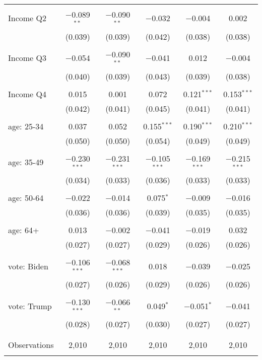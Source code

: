 \begin{tabular}{@{\extracolsep{5pt}}lccccc}
  & & & & & \\ 
 Income Q2 & $-$0.089$^{**}$ & $-$0.090$^{**}$ & $-$0.032 & $-$0.004 & 0.002 \\ 
  & (0.039) & (0.039) & (0.042) & (0.038) & (0.038) \\ 
  & & & & & \\ 
 Income Q3 & $-$0.054 & $-$0.090$^{**}$ & $-$0.041 & 0.012 & $-$0.004 \\ 
  & (0.040) & (0.039) & (0.043) & (0.039) & (0.038) \\ 
  & & & & & \\ 
 Income Q4 & 0.015 & 0.001 & 0.072 & 0.121$^{***}$ & 0.153$^{***}$ \\ 
  & (0.042) & (0.041) & (0.045) & (0.041) & (0.041) \\ 
  & & & & & \\ 
 age: 25-34 & 0.037 & 0.052 & 0.155$^{***}$ & 0.190$^{***}$ & 0.210$^{***}$ \\ 
  & (0.050) & (0.050) & (0.054) & (0.049) & (0.049) \\ 
  & & & & & \\ 
 age: 35-49 & $-$0.230$^{***}$ & $-$0.231$^{***}$ & $-$0.105$^{***}$ & $-$0.169$^{***}$ & $-$0.215$^{***}$ \\ 
  & (0.034) & (0.033) & (0.036) & (0.033) & (0.033) \\ 
  & & & & & \\ 
 age: 50-64 & $-$0.022 & $-$0.014 & 0.075$^{*}$ & $-$0.009 & $-$0.016 \\ 
  & (0.036) & (0.036) & (0.039) & (0.035) & (0.035) \\ 
  & & & & & \\ 
 age: 64+ & 0.013 & $-$0.002 & $-$0.041 & $-$0.019 & 0.032 \\ 
  & (0.027) & (0.027) & (0.029) & (0.026) & (0.026) \\ 
  & & & & & \\ 
 vote: Biden & $-$0.106$^{***}$ & $-$0.068$^{***}$ & 0.018 & $-$0.039 & $-$0.025 \\ 
  & (0.027) & (0.026) & (0.029) & (0.026) & (0.026) \\ 
  & & & & & \\ 
 vote: Trump & $-$0.130$^{***}$ & $-$0.066$^{**}$ & 0.049$^{*}$ & $-$0.051$^{*}$ & $-$0.041 \\ 
  & (0.028) & (0.027) & (0.030) & (0.027) & (0.027) \\ 
  & & & & & \\ 
\hline \\[-1.8ex] 

Observations & 2,010 & 2,010 & 2,010 & 2,010 & 2,010 \\ 
\hline 
\hline \\[-1.8ex] 
\end{tabular} 
